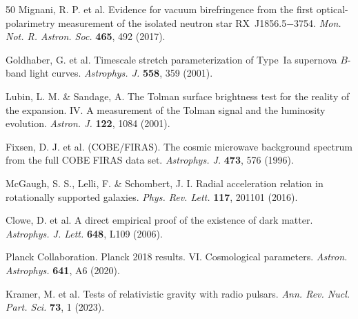 \documentclass[11pt,a4paper]{article}
\begin{document}
\begin{thebibliography}{50}
 Mignani, R. P. et al. Evidence for vacuum birefringence from the first
optical-polarimetry measurement of the isolated neutron star RX~J1856.5$-$3754. \emph{Mon. Not.
R. Astron. Soc.} \textbf{465}, 492 (2017).

 Goldhaber, G. et al. Timescale stretch parameterization of Type~Ia
supernova $B$-band light curves. \emph{Astrophys. J.} \textbf{558}, 359 (2001).

 Lubin, L. M. \& Sandage, A. The Tolman surface brightness test for the
reality of the expansion. IV. A measurement of the Tolman signal and the luminosity evolution.
\emph{Astron. J.} \textbf{122}, 1084 (2001).

 Fixsen, D. J. et al. (COBE/FIRAS). The cosmic microwave background spectrum
from the full COBE FIRAS data set. \emph{Astrophys. J.} \textbf{473}, 576 (1996).

 McGaugh, S. S., Lelli, F. \& Schombert, J. I. Radial acceleration relation
in rotationally supported galaxies. \emph{Phys. Rev. Lett.} \textbf{117}, 201101 (2016).

 Clowe, D. et al. A direct empirical proof of the existence of dark matter.
\emph{Astrophys. J. Lett.} \textbf{648}, L109 (2006).

 Planck Collaboration. Planck 2018 results. VI. Cosmological parameters.
\emph{Astron. Astrophys.} \textbf{641}, A6 (2020).

 Kramer, M. et al. Tests of relativistic gravity with radio pulsars.
\emph{Ann. Rev. Nucl. Part. Sci.} \textbf{73}, 1 (2023).

\end{thebibliography}
\end{document}
